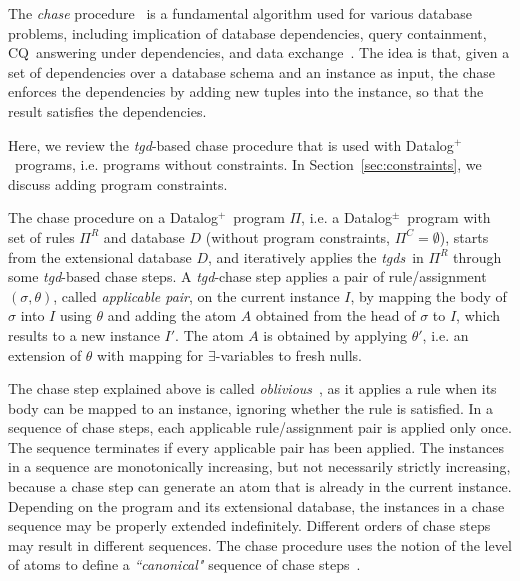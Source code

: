\documentclass[format=acmsmall, review=false, screen=true]{acmart}
\newcommand{\cq}{CQ}
\newcommand{\boxtheorem}{\ensuremath{\hfill \Box}}
\newcommand{\mc}[1]{\mathcal{ #1}}
\newcommand{\dpm}{{Datalog}$^\pm$}
\newcommand{\rules}{\Pi^{R}}
\newcommand{\constraints}{\Pi^{C}}
\newcommand{\myrightarrow}[1]{\xrightarrow{~#1~}}
\newcommand{\dplus}{{Datalog}$^+$}
\newcommand{\tgds}{{\em tgds}}
\newcommand{\tgd}{{\em tgd}}
\begin{document}
{{The \emph{chase} procedure~\cite{aho,beeri} is a fundamental algorithm used for various database problems, including implication of database dependencies, query containment, \cq \ answering under dependencies, and data exchange~\cite{beeri,cali03,fagin,johnson,maier}. The idea is that, given a set of dependencies over a database schema and an instance as input, the chase enforces the dependencies by adding new tuples into the instance, so that the result satisfies the dependencies.

Here, we review the \tgd-based chase procedure that is used with \dplus \ programs, i.e. programs without constraints. In Section~\ref{sec:constraints}, we discuss adding program constraints.

The chase procedure on a \dplus \ program $\Pi$, i.e. a \dpm \ program with set of rules $\rules$ and database $D$ (without program constraints, $\constraints=\emptyset$), starts from the extensional database $D$, and iteratively applies the \tgds \ in $\rules$ through some \tgd-based chase steps. A \tgd-chase step applies a pair of rule/assignment $(\sigma,\theta)$, called {\em applicable pair}, on the current instance $I$, by mapping the body of $\sigma$ into $I$ using $\theta$ and adding the atom $A$ obtained from the head of $\sigma$ to $I$, which results to a new instance $I'$. The atom $A$ is obtained by applying $\theta'$, i.e. an extension of $\theta$ with mapping for $\exists$-variables to fresh nulls.



The chase step explained above is called {\em oblivious}~\cite{cali13}, as it applies a rule when its body can be mapped to an instance, ignoring whether the rule is satisfied. In a sequence of chase steps, each applicable rule/assignment pair is applied only once. The sequence terminates if every applicable pair has been applied. The instances in a sequence are monotonically increasing, but not necessarily strictly increasing, because a chase step can generate an atom that is already in the current instance. Depending on the program and its extensional database, the instances in a chase sequence may be properly extended indefinitely. Different orders of chase steps may result in different sequences. The chase procedure uses the notion of the level of atoms to define a {\em ``canonical"} sequence of chase steps~\cite{cali13}.

}}
\end{document}
